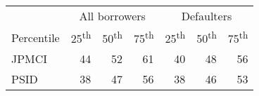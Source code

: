 \begin{tabular}{lrrrrrr}
\hline\hline
 & \multicolumn{3}{c}{All borrowers} & \multicolumn{3}{c}{Defaulters} \\ 
\cmidrule(lr){2-4} \cmidrule(lr){5-7}
Percentile & 25\textsuperscript{th} & 50\textsuperscript{th} & 75\textsuperscript{th} & 25\textsuperscript{th} & 50\textsuperscript{th} & 75\textsuperscript{th} \\ 
\midrule
JPMCI & 44 & 52 & 61 & 40 & 48 & 56 \\ 
PSID & 38 & 47 & 56 & 38 & 46 & 53 \\ 
\bottomrule
\end{tabular}
